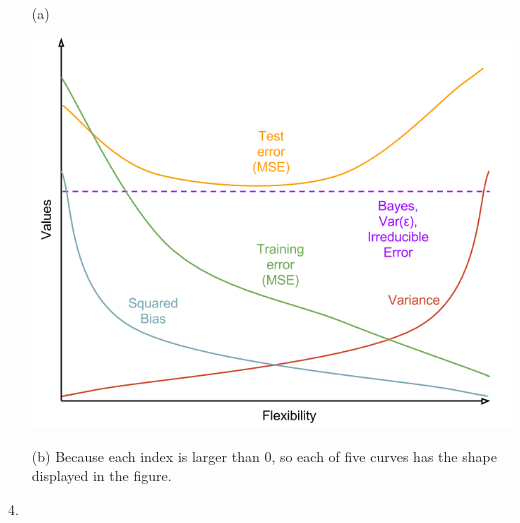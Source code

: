 \documentclass[12pt]{article}
\begin{document}
\begin{itemize}
\item[(a)]
\ \\
\centerline{\includegraphics[width=1.0\linewidth]{bias-variance-decomposition}}
\item[(b)]
Because each index is larger than $0$, so each of five curves has the shape displayed in the figure.
\end{itemize}
\Large{4.}
\normalsize
\end{document}

